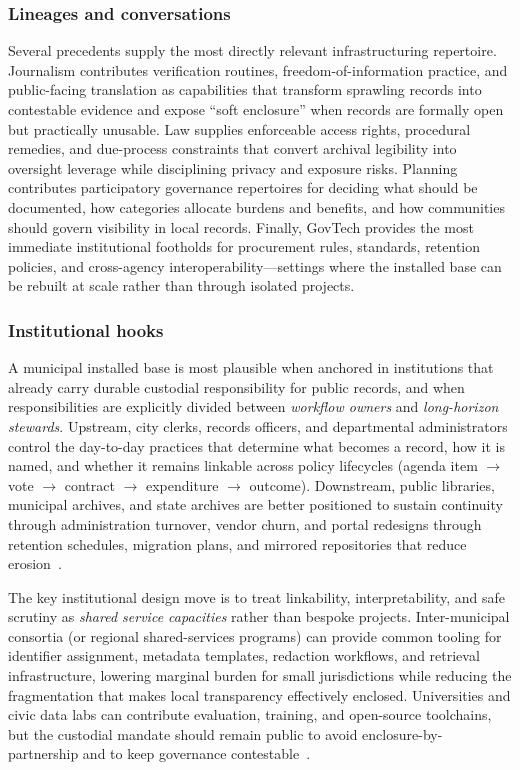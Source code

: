 \documentclass[acmsmall,screen]{acmart}
\begin{document}
\subsubsection*{Lineages and conversations}
Several precedents supply the most directly relevant infrastructuring repertoire. Journalism contributes verification routines, freedom-of-information practice, and public-facing translation as capabilities that transform sprawling records into contestable evidence and expose ``soft enclosure'' when records are formally open but practically unusable. Law supplies enforceable access rights, procedural remedies, and due-process constraints that convert archival legibility into oversight leverage while disciplining privacy and exposure risks. Planning contributes participatory governance repertoires for deciding what should be documented, how categories allocate burdens and benefits, and how communities should govern visibility in local records. Finally, GovTech provides the most immediate institutional footholds for procurement rules, standards, retention policies, and cross-agency interoperability---settings where the installed base can be rebuilt at scale rather than through isolated projects.

\subsubsection*{Institutional hooks}
A municipal installed base is most plausible when anchored in institutions that already carry durable custodial responsibility for public records, and when responsibilities are explicitly divided between \emph{workflow owners} and \emph{long-horizon stewards}. Upstream, city clerks, records officers, and departmental administrators control the day-to-day practices that determine what becomes a record, how it is named, and whether it remains linkable across policy lifecycles (agenda item \(\rightarrow\) vote \(\rightarrow\) contract \(\rightarrow\) expenditure \(\rightarrow\) outcome). Downstream, public libraries, municipal archives, and state archives are better positioned to sustain continuity through administration turnover, vendor churn, and portal redesigns through retention schedules, migration plans, and mirrored repositories that reduce erosion~\cite{karastiStudyingInfrastructuringEthnographically2018a,acker_DataCraftTheory_2019}.

The key institutional design move is to treat linkability, interpretability, and safe scrutiny as \emph{shared service capacities} rather than bespoke projects. Inter-municipal consortia (or regional shared-services programs) can provide common tooling for identifier assignment, metadata templates, redaction workflows, and retrieval infrastructure, lowering marginal burden for small jurisdictions while reducing the fragmentation that makes local transparency effectively enclosed. Universities and civic data labs can contribute evaluation, training, and open-source toolchains, but the custodial mandate should remain public to avoid enclosure-by-partnership and to keep governance contestable~\cite{aanestadInformationInfrastructuresChallenge2017,starEthnographyInfrastructure1999a}.
\end{document}
